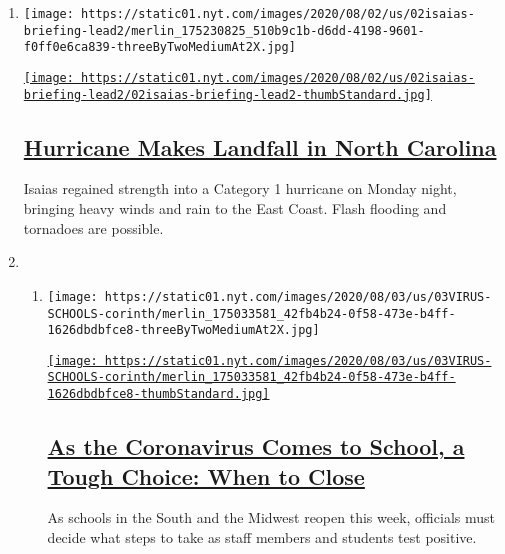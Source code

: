 \begin{enumerate}
\def\labelenumi{\arabic{enumi}.}
\item
  \texttt{[image: https://static01.nyt.com/images/2020/08/02/us/02isaias-briefing-lead2/merlin\_175230825\_510b9c1b-d6dd-4198-9601-f0ff0e6ca839-threeByTwoMediumAt2X.jpg]}

  \href{/2020/08/03/us/isaias-storm-updates.html}{\texttt{[image: https://static01.nyt.com/images/2020/08/02/us/02isaias-briefing-lead2/02isaias-briefing-lead2-thumbStandard.jpg]}}

  \hypertarget{hurricane-makes-landfall-in-north-carolina}{%
  \subsection{\texorpdfstring{\href{/2020/08/03/us/isaias-storm-updates.html}{Hurricane
  Makes Landfall in North
  Carolina}}{Hurricane Makes Landfall in North Carolina}}\label{hurricane-makes-landfall-in-north-carolina}}

  Isaias regained strength into a Category 1 hurricane on Monday night,
  bringing heavy winds and rain to the East Coast. Flash flooding and
  tornadoes are possible.
\item
  \begin{enumerate}
  \def\labelenumii{\arabic{enumii}.}
  \item
    \texttt{[image: https://static01.nyt.com/images/2020/08/03/us/03VIRUS-SCHOOLS-corinth/merlin\_175033581\_42fb4b24-0f58-473e-b4ff-1626dbdbfce8-threeByTwoMediumAt2X.jpg]}

    \href{/2020/08/03/us/school-closing-coronavirus.html}{\texttt{[image: https://static01.nyt.com/images/2020/08/03/us/03VIRUS-SCHOOLS-corinth/merlin\_175033581\_42fb4b24-0f58-473e-b4ff-1626dbdbfce8-thumbStandard.jpg]}}

    \hypertarget{as-the-coronavirus-comes-to-school-a-tough-choice-when-to-close}{%
    \subsection{\texorpdfstring{\href{/2020/08/03/us/school-closing-coronavirus.html}{As
    the Coronavirus Comes to School, a Tough Choice: When to
    Close}}{As the Coronavirus Comes to School, a Tough Choice: When to Close}}\label{as-the-coronavirus-comes-to-school-a-tough-choice-when-to-close}}

    As schools in the South and the Midwest reopen this week, officials
    must decide what steps to take as staff members and students test
    positive.


\end{enumerate}
\end{enumerate}
